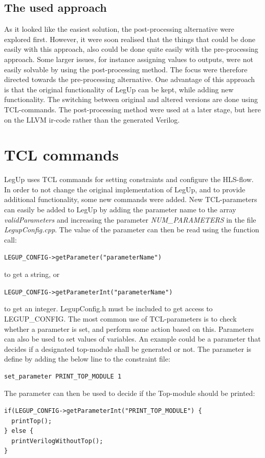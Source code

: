 \subsection{The used approach}
As it looked like the easiest solution, the post-processing alternative were explored first. However, it were soon realised that the things that could be done easily with this approach, also could be done quite easily with the pre-processing approach. Some larger issues, for instance assigning values to outputs, were not easily solvable by using the post-processing method. The focus were therefore directed towards the pre-processing alternative. One advantage of this approach is that the original functionality of LegUp can be kept, while adding new functionality. The switching between original and altered versions are done using TCL-commands. The post-processing method were used at a later stage, but here on the LLVM \gls{ir}-code rather than the generated Verilog.

\section{TCL commands}
LegUp uses TCL commands for setting constraints and configure the HLS-flow. In order to not change the original implementation of LegUp, and to provide additional functionality, some new commands were added. New TCL-parameters can easily be added to LegUp by adding the parameter name to the array \textit{validParameters} and increasing the parameter \textit{NUM\_PARAMETERS} in the file \textit{LegupConfig.cpp}. The value of the parameter can then be read using the function call:

\verb!LEGUP_CONFIG->getParameter("parameterName")!

to get a string, or 

\verb!LEGUP_CONFIG->getParameterInt("parameterName")! 

to get an integer. LegupConfig.h must be included to get access to LEGUP\_CONFIG. The most common use of TCL-parameters is to check whether a parameter is set, and perform some action based on this. Parameters can also be used to set values of variables. An example could be a parameter that decides if a designated top-module shall be generated or not. The parameter is define by adding the below line to the constraint file:

\begin{verbatim}
set_parameter PRINT_TOP_MODULE 1
\end{verbatim}
The parameter can then be used to decide if the Top-module should be printed:
\lstset{language=C++,style=Cstyle}
\begin{lstlisting}
if(LEGUP_CONFIG->getParameterInt("PRINT_TOP_MODULE") {
  printTop();
} else {
  printVerilogWithoutTop();
}
\end{lstlisting}

